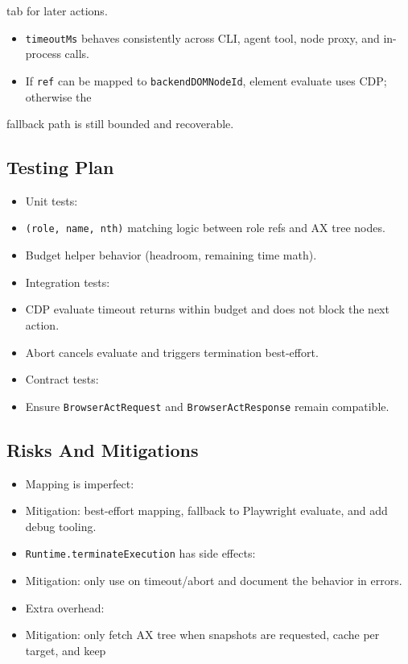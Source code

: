 tab for later actions.
\begin{itemize}
  \item \texttt{timeoutMs} behaves consistently across CLI, agent tool, node proxy, and in-process calls.
  \item If \texttt{ref} can be mapped to \texttt{backendDOMNodeId}, element evaluate uses CDP; otherwise the
\end{itemize}

fallback path is still bounded and recoverable.

\subsection{Testing Plan}


\begin{itemize}
  \item Unit tests:
  \item \texttt{(role, name, nth)} matching logic between role refs and AX tree nodes.
  \item Budget helper behavior (headroom, remaining time math).
  \item Integration tests:
  \item CDP evaluate timeout returns within budget and does not block the next action.
  \item Abort cancels evaluate and triggers termination best-effort.
  \item Contract tests:
  \item Ensure \texttt{BrowserActRequest} and \texttt{BrowserActResponse} remain compatible.
\end{itemize}


\subsection{Risks And Mitigations}


\begin{itemize}
  \item Mapping is imperfect:
  \item Mitigation: best-effort mapping, fallback to Playwright evaluate, and add debug tooling.
  \item \texttt{Runtime.terminateExecution} has side effects:
  \item Mitigation: only use on timeout/abort and document the behavior in errors.
  \item Extra overhead:
  \item Mitigation: only fetch AX tree when snapshots are requested, cache per target, and keep
\end{itemize}

